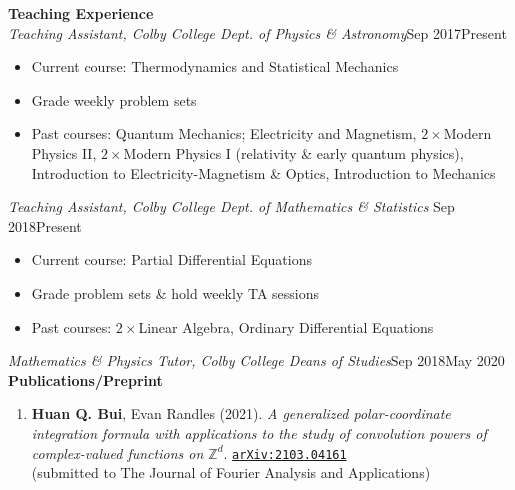 \documentclass[10pt]{article}
\begin{document}
\noindent \large{{\textbf{Teaching Experience}}} \normalsize \\ 
\noindent \textit{Teaching Assistant, Colby College Dept. of Physics \& Astronomy}\hfill Sep 2017\textendash Present \vspace{-5pt}
\begin{itemize}
	\setlength\itemsep{-4pt}
	\item Current course: Thermodynamics and Statistical Mechanics
	\item Grade weekly problem sets 
	\item Past courses:  Quantum Mechanics; Electricity and Magnetism, $2\times$Modern Physics II, $2\times$Modern Physics I (relativity \& early quantum physics), Introduction to Electricity-Magnetism \& Optics, Introduction to Mechanics 
\end{itemize}


\noindent \textit{Teaching Assistant, Colby College Dept. of Mathematics \& Statistics} \hfill Sep 2018\textendash Present \vspace{-5pt}
\begin{itemize}
	\setlength\itemsep{-4pt}
	\item Current course: Partial Differential Equations
	\item Grade problem sets \& hold weekly TA sessions
	\item Past courses: $2\times$Linear Algebra, Ordinary Differential Equations
\end{itemize}


\noindent \textit{Mathematics \& Physics Tutor, Colby College Deans of Studies}\hfill  Sep 2018\textendash May 2020\\




\noindent \large{\textbf{{Publications/Preprint}}}	\normalsize	\vspace{-5pt}
\begin{enumerate}
	\setlength\itemsep{-4pt}
	\item \textbf{Huan Q. Bui}, Evan Randles (2021). \textit{A generalized polar-coordinate integration formula with applications to the study of convolution powers of complex-valued functions on $\mathbb{Z}^d$}. \href{https://arxiv.org/abs/2103.04161}{\texttt{arXiv:2103.04161}} \\
	(submitted to The Journal of Fourier Analysis and Applications)
\end{enumerate}
				
\end{document}
